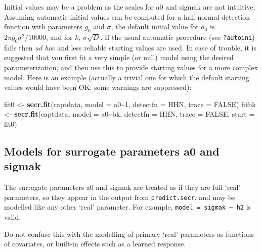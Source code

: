 \documentclass[
]{book}
\newenvironment{Shaded}{\begin{snugshade}}{\end{snugshade}}
\newcommand{\AttributeTok}[1]{\textcolor[rgb]{0.13,0.29,0.53}{#1}}
\newcommand{\ConstantTok}[1]{\textcolor[rgb]{0.56,0.35,0.01}{#1}}
\newcommand{\DecValTok}[1]{\textcolor[rgb]{0.00,0.00,0.81}{#1}}
\newcommand{\FunctionTok}[1]{\textcolor[rgb]{0.13,0.29,0.53}{\textbf{#1}}}
\newcommand{\NormalTok}[1]{#1}
\newcommand{\OtherTok}[1]{\textcolor[rgb]{0.56,0.35,0.01}{#1}}
\newcommand{\SpecialCharTok}[1]{\textcolor[rgb]{0.81,0.36,0.00}{\textbf{#1}}}
\newcommand{\StringTok}[1]{\textcolor[rgb]{0.31,0.60,0.02}{#1}}
\begin{document}
Initial values may be a problem as the scales for a0 and sigmak are not intuitive. Assuming automatic initial values can be computed for a half-normal detection function with parameters \(g_0\) and \(\sigma\), the default initial value for \(a_0\) is \(2 \pi g_0 \sigma^2 /10000\), and for \(k\), \(\sigma \sqrt{D}\). If the usual automatic procedure (see \texttt{?autoini}) fails then \emph{ad hoc} and less reliable starting values are used. In case of trouble, it is suggested that you first fit a very simple (or null) model using the desired parameterization, and then use this to provide starting values for a more complex model. Here is an example (actually a trivial one for which the default starting values would have been OK; some warnings are suppressed):

\begin{Shaded}
\begin{Highlighting}[]
\NormalTok{fit0  }\OtherTok{\textless{}{-}} \FunctionTok{secr.fit}\NormalTok{(captdata, }\AttributeTok{model =}\NormalTok{ a0}\SpecialCharTok{\textasciitilde{}}\DecValTok{1}\NormalTok{, }\AttributeTok{detectfn =} \StringTok{\textquotesingle{}HHN\textquotesingle{}}\NormalTok{,}
                  \AttributeTok{trace =} \ConstantTok{FALSE}\NormalTok{)}
\NormalTok{fitbk }\OtherTok{\textless{}{-}} \FunctionTok{secr.fit}\NormalTok{(captdata, }\AttributeTok{model =}\NormalTok{ a0}\SpecialCharTok{\textasciitilde{}}\NormalTok{bk, }\AttributeTok{detectfn =} \StringTok{\textquotesingle{}HHN\textquotesingle{}}\NormalTok{, }
                  \AttributeTok{trace =} \ConstantTok{FALSE}\NormalTok{, }\AttributeTok{start =}\NormalTok{ fit0)}
\end{Highlighting}
\end{Shaded}

\subsection{Models for surrogate parameters a0 and sigmak}\label{models-for-surrogate-parameters-a0-and-sigmak}

The surrogate parameters a0 and sigmak are treated as if they are full `real' parameters, so they appear in the output from \texttt{predict.secr}, and may be modelled like any other `real' parameter. For example, \texttt{model\ =\ sigmak\ \textasciitilde{}\ h2} is valid.

Do not confuse this with the modelling of primary `real' parameters as
functions of covariates, or built-in effects such as a learned response.
\end{document}

